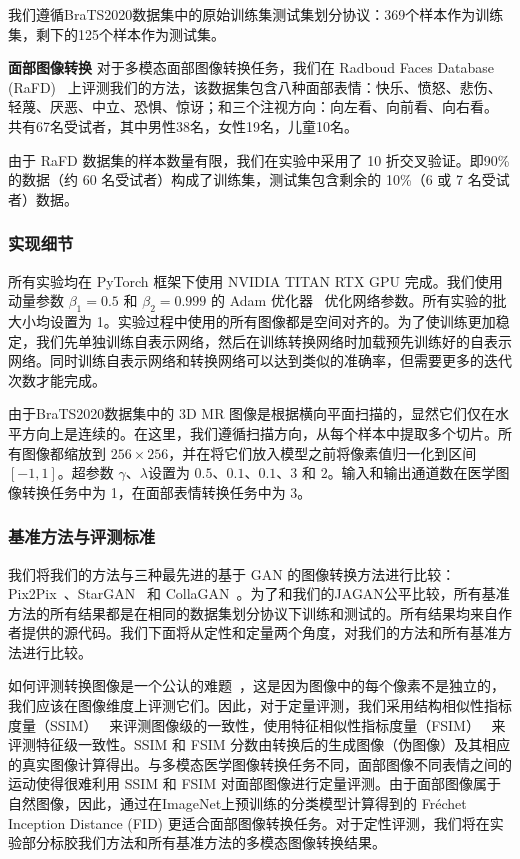 我们遵循BraTS2020数据集中的原始训练集测试集划分协议：369个样本作为训练集，剩下的125个样本作为测试集。

\textbf{面部图像转换}
对于多模态面部图像转换任务，我们在 Radboud Faces Database (RaFD)~\cite{langner2010presentation} 上评测我们的方法，该数据集包含八种面部表情：快乐、愤怒、悲伤、轻蔑、厌恶、中立、恐惧、惊讶；和三个注视方向：向左看、向前看、向右看。 共有67名受试者，其中男性38名，女性19名，儿童10名。

由于 RaFD 数据集的样本数量有限，我们在实验中采用了 10 折交叉验证。即90\%的数据（约 60 名受试者）构成了训练集，测试集包含剩余的 10\%（6 或 7 名受试者）数据。

\subsubsection{实现细节}
所有实验均在 PyTorch 框架下使用 NVIDIA TITAN RTX GPU 完成。我们使用动量参数 $\beta_1 = 0.5$ 和 $\beta_2 = 0.999$ 的 Adam 优化器~\cite{kingma2014adam} 优化网络参数。所有实验的批大小均设置为 1。实验过程中使用的所有图像都是空间对齐的。为了使训练更加稳定，我们先单独训练自表示网络，然后在训练转换网络时加载预先训练好的自表示网络。同时训练自表示网络和转换网络可以达到类似的准确率，但需要更多的迭代次数才能完成。

由于BraTS2020数据集中的 3D MR 图像是根据横向平面扫描的，显然它们仅在水平方向上是连续的。在这里，我们遵循扫描方向，从每个样本中提取多个切片。所有图像都缩放到 $256\times256$，并在将它们放入模型之前将像素值归一化到区间 $[-1, 1]$。超参数 $\gamma$、$\lambda$设置为 $0.5$、$0.1$、$0.1$、$3$ 和 $2$。输入和输出通道数在医学图像转换任务中为 1，在面部表情转换任务中为 3。

\subsubsection{基准方法与评测标准}

我们将我们的方法与三种最先进的基于 GAN 的图像转换方法进行比较：Pix2Pix~\cite{pix2pix}、StarGAN~\cite{stargan} 和 CollaGAN~\cite{collagan}。为了和我们的JAGAN公平比较，所有基准方法的所有结果都是在相同的数据集划分协议下训练和测试的。所有结果均来自作者提供的源代码。我们下面将从定性和定量两个角度，对我们的方法和所有基准方法进行比较。

如何评测转换图像是一个公认的难题~\cite{salimans2016improved}，这是因为图像中的每个像素不是独立的，我们应该在图像维度上评测它们。因此，对于定量评测，我们采用结构相似性指标度量（SSIM）~\cite{ssim} 来评测图像级的一致性，使用特征相似性指标度量（FSIM）~\cite{fsim} 来评测特征级一致性。SSIM 和 FSIM 分数由转换后的生成图像（伪图像）及其相应的真实图像计算得出。与多模态医学图像转换任务不同，面部图像不同表情之间的运动使得很难利用 SSIM 和 FSIM 对面部图像进行定量评测。由于面部图像属于自然图像，因此，通过在ImageNet上预训练的分类模型计算得到的 Fréchet Inception Distance (FID)\cite{fid} 更适合面部图像转换任务。对于定性评测，我们将在实验部分标胶我们方法和所有基准方法的多模态图像转换结果。


